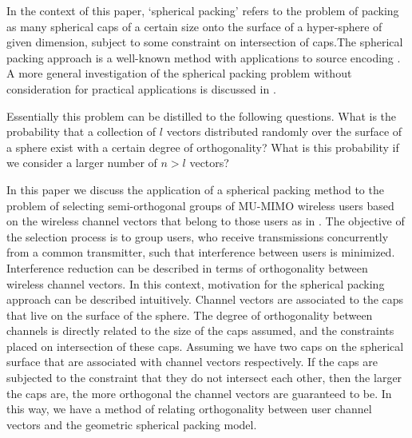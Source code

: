 In the context of this paper, `spherical packing' refers to the problem of packing as many spherical caps of a certain size onto the surface of a hyper-sphere of given dimension, subject to some constraint on intersection of caps.The spherical packing approach is a well-known method with applications to source encoding \cite{Shannon1959}. A more general investigation of the spherical packing problem without consideration for practical applications is discussed in \cite{Rankin1955}.

Essentially this problem can be distilled to the following questions. What is the probability that a collection of $l$ vectors distributed randomly over the surface of a sphere exist with a certain degree of orthogonality? What is this probability if we consider a larger number of $n>l$ vectors?

In this paper we discuss the application of a spherical packing method to the problem of selecting semi-orthogonal groups of MU-MIMO wireless users based on the wireless channel vectors that belong to those users as in \cite{Swannack2005}. The objective of the selection process is to group users, who receive transmissions concurrently from a common transmitter, such that interference between users is minimized. Interference reduction can be described in terms of orthogonality between wireless channel vectors. In this context, motivation for the spherical packing approach can be described intuitively. Channel vectors are associated to the caps that live on the surface of the sphere. The degree of orthogonality between channels is directly related to the size of the caps assumed, and the constraints placed on intersection of these caps. Assuming we have two caps on the spherical surface that are associated with channel vectors respectively. If the caps are subjected to the constraint that they do not intersect each other, then the larger the caps are, the more orthogonal the channel vectors are guaranteed to be. In this way, we have a method of relating orthogonality between user channel vectors and the geometric spherical packing model.

